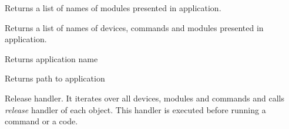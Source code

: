 \documentclass[letterpaper,10pt,english]{sphinxmanual}
\begin{document}
\begin{fulllineitems}

\begin{fulllineitems}
\label{sysmod:pyfrid.modules.system.app.BaseApplicationModule.modules}
Returns a list of names of modules presented in application.

\end{fulllineitems}


\begin{fulllineitems}
\label{sysmod:pyfrid.modules.system.app.BaseApplicationModule.objects}
Returns a list of names of devices, commands and modules presented in application.

\end{fulllineitems}


\begin{fulllineitems}
\label{sysmod:pyfrid.modules.system.app.BaseApplicationModule.projname}
Returns application name

\end{fulllineitems}


\begin{fulllineitems}
\label{sysmod:pyfrid.modules.system.app.BaseApplicationModule.projpath}
Returns path to application

\end{fulllineitems}


\begin{fulllineitems}
\label{sysmod:pyfrid.modules.system.app.BaseApplicationModule.release}
Release handler. It iterates over all devices, modules and commands and calls \emph{release} handler of each object.
This handler is executed before running a command or a code.

\end{fulllineitems}


\end{fulllineitems}
\end{document}

